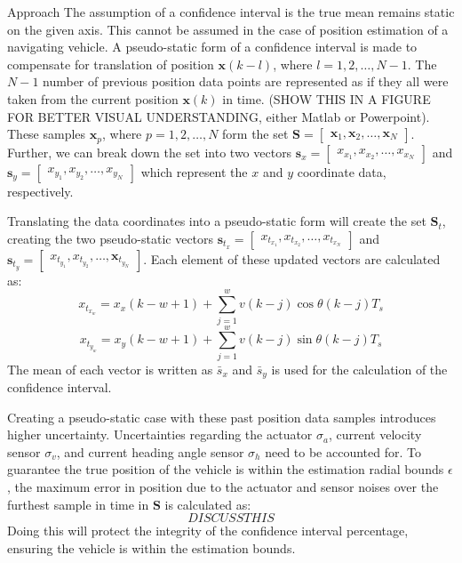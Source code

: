 \begin{section}{Approach}
The assumption of a confidence interval is the true mean remains static on the given axis. This cannot be assumed in the case of position estimation of a navigating vehicle. A pseudo-static form of a confidence interval is made to compensate for translation of position $\bm{x}(k-l)$, where $l=1,2,\dots,N-1$. The $N-1$ number of previous position data points are represented as if they all were taken from the current position $\bm{x}(k)$ in time. (SHOW THIS IN A FIGURE FOR BETTER VISUAL UNDERSTANDING, either Matlab or Powerpoint). These samples $\bm{x}_p$, where $p=1,2,\dots,N$ form the set $\mathcal{\bm{S}}=\begin{bmatrix}\bm{x}_1,\bm{x}_2,\dots,\bm{x}_N \end{bmatrix}$. Further, we can break down the set into two vectors $\bm{s}_x=\begin{bmatrix} x_x_1,x_x_2,\dots,x_x_N \end{bmatrix}$ and $\bm{s}_y=\begin{bmatrix} x_y_1,x_y_2,\dots,x_y_N \end{bmatrix}$ which represent the $x$ and $y$ coordinate data, respectively. 

Translating the data coordinates into a pseudo-static form will create the set $\mathcal{\bm{S}}_t$, creating the two pseudo-static vectors $\bm{s}_{t_x}=\begin{bmatrix} x_{t_x_1},x_{t_x_2},\dots,x_{t_x_N} \end{bmatrix}$ and $\bm{s}_{t_y}=\begin{bmatrix} x_{t_y_1},x_{t_y_2},\dots,\bm{x}_{t_y_N} \end{bmatrix}$. Each element of these updated vectors are calculated as:
    \begin{equation}
	x_{t_x_w} = x_x(k-w+1)+\sum_{j=1}^w v(k-j)\cos{\theta(k-j)T_s}
	\end{equation}
	\begin{equation}
	x_{t_y_w} = x_y(k-w+1)+\sum_{j=1}^w v(k-j)\sin{\theta(k-j)T_s}
	\end{equation}
The mean of each vector is written as $\bar{s}_x$ and $\bar{s}_y$ is used for the calculation of the confidence interval.

Creating a pseudo-static case with these past position data samples introduces higher uncertainty. Uncertainties regarding the actuator $\sigma_a$, current velocity sensor $\sigma_v$, and current heading angle sensor $\sigma_h$ need to be accounted for. To guarantee the true position of the vehicle is within the estimation radial bounds $\epsilon$, the maximum error in position due to the actuator and sensor noises over the furthest sample in time in $\mathcal{\bm{S}}$ is calculated as:
    \begin{equation}
	DISCUSS THIS
	\end{equation}
Doing this will protect the integrity of the confidence interval percentage, ensuring the vehicle is within the estimation bounds.



\end{section}
